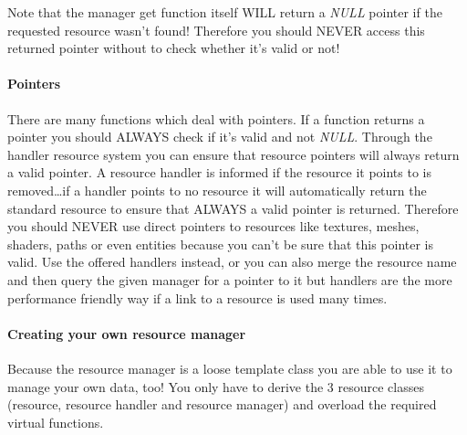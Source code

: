 Note that the manager get function itself WILL return a \emph{NULL} pointer if the requested resource wasn't found! Therefore you should NEVER access this returned pointer without to check whether it's valid or not!


\paragraph{Pointers}
There are many functions which deal with pointers. If a function returns a pointer you should ALWAYS check if it's valid and not \emph{NULL}. Through the handler resource system you can ensure that resource pointers will always return a valid pointer. A resource handler is informed if the resource it points to is removed\ldots if a handler points to no resource it will automatically return the standard resource to ensure that ALWAYS a valid pointer is returned. Therefore you should NEVER use direct pointers to resources like textures, meshes, shaders, paths or even entities because you can't be sure that this pointer is valid. Use the offered handlers instead, or you can also merge the resource name and then query the given manager for a pointer to it but handlers are the more performance friendly way if a link to a resource is used many times.


\paragraph{Creating your own resource manager}
Because the resource manager is a loose template class you are able to use it to manage your own data, too! You only have to derive the 3 resource classes (resource, resource handler and resource manager) and overload the required virtual functions.

